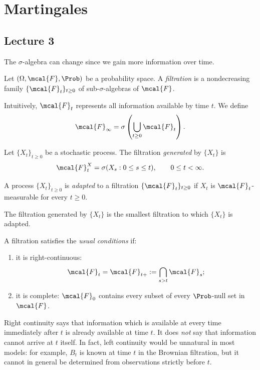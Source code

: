 \chapter{Martingales}
\section{Lecture 3}

The $\sigma$-algebra can change since we gain more information over time.

\begin{definition}[Filtration]
Let $(\Omega,\mcal{F},\Prob)$ be a probability space. A
\emph{filtration} is a nondecreasing family
$\{\mcal{F}_t\}_{t\geq 0}$ of sub-$\sigma$-algebras of $\mcal{F}$.
\end{definition}

Intuitively, $\mcal{F}_t$ represents all information available by time
$t$. We define
\[
    \mcal{F}_\infty
    = \sigma\left(\bigcup_{t\geq 0}\mcal{F}_t\right).
\]

Let $\{X_t\}_{t\geq 0}$ be a stochastic process. The filtration
\emph{generated} by $\{X_t\}$ is
\[
    \mcal{F}_t^X = \sigma(X_s:0\leq s\leq t),
    \qquad 0\leq t<\infty.
\]

\begin{definition}
A process $\{X_t\}_{t\geq 0}$ is \emph{adapted} to a filtration
$\{\mcal{F}_t\}_{t\geq 0}$ if $X_t$ is $\mcal{F}_t$-measurable for
every $t\geq 0$.
\end{definition}

The filtration generated by $\{X_t\}$ is the smallest filtration to
which $\{X_t\}$ is adapted.

\begin{definition}
A filtration satisfies the \emph{usual conditions} if:

\begin{enumerate}
    \item[(i)] it is right-continuous:
    \[
        \mcal{F}_t
        = \mcal{F}_{t+}
        := \bigcap_{s>t}\mcal{F}_s;
    \]

    \item[(ii)] it is complete: $\mcal{F}_0$ contains every subset of
    every $\Prob$-null set in $\mcal{F}$.
\end{enumerate}
\end{definition}

Right continuity says that information which is available at every time
immediately after $t$ is already available at time $t$. It does
\emph{not} say that information cannot arrive at $t$ itself. In fact,
left continuity would be unnatural in most models: for example,
$B_t$ is known at time $t$ in the Brownian filtration, but it cannot in
general be determined from observations strictly before $t$.

